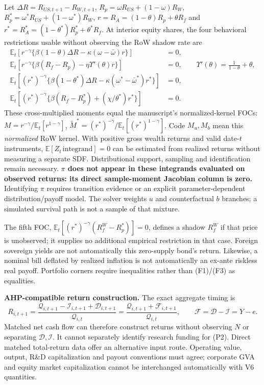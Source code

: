 \documentclass[10pt,a4paper,landscape]{article}
\newcommand{\E}{\mathbb E_t}
\newcommand{\Q}{\mathcal Q}\newcommand{\I}{\mathcal I}\newcommand{\D}{\mathcal D}
\begin{document}
Let $\Delta R=R_{US,t+1}-R_{W,t+1}$, $R_p=\omega R_{US}+(1-\omega)R_W$, $R_p^*=\omega^*R_{US}+(1-\omega^*)R_W$, $r=R_A=(1-\theta)R_p+\theta R_f$ and $r^*=R_A^*=(1-\theta^*)R_p^*+\theta^*R_f$. At interior equity shares, the four behavioral restrictions usable without observing the RoW shadow rate are
\begin{align}
 \E\!\left[r^{-\gamma}\{\beta(1-\theta)\Delta R-\kappa(\omega-\bar\omega)r\}\right]&=0, \tag{F1}\label{eq:F1}\\
 \E\!\left[r^{-\gamma}\{\beta(R_f-R_p)-\eta\Upsilon'(\theta)r\}\right]&=0,\qquad
 \Upsilon'(\theta)=\frac1{1-\theta}+\theta, \tag{F2}\label{eq:F2}\\
 \E\!\left[(r^*)^{-\gamma}\{\beta(1-\theta^*)\Delta R-\kappa(\omega^*-\bar\omega^*)r^*\}\right]&=0, \tag{F3}\label{eq:F3}\\
 \E\!\left[(r^*)^{-\gamma}\{\beta(R_f-R_p^*)+(\chi/\theta^*)r^*\}\right]&=0. \tag{F4}\label{eq:F4}
\end{align}
These cross-multiplied moments equal the manuscript's normalized-kernel FOCs: $M=r^{-\gamma}/\E[r^{1-\gamma}]$, $\widetilde M^*=(r^*)^{-\gamma}/\E[(r^*)^{1-\gamma}]$. Code $M_u,M_b$ mean this \emph{normalized} RoW kernel. With positive gross wealth returns and valid date-$t$ instruments, $\mathbb E[Z_t\,\text{integrand}]=0$ can be estimated from realized returns without measuring a separate SDF. Distributional support, sampling and identification remain necessary. \textbf{$\pi$ does not appear in these integrands evaluated on observed returns: its direct sample-moment Jacobian column is zero.} Identifying $\pi$ requires transition evidence or an explicit parameter-dependent distribution/payoff model. The solver weights $u$ and counterfactual $b$ branches; a simulated survival path is not a sample of that mixture.

The fifth FOC, $\E[(r^*)^{-\gamma}(R_f^W-R_p^*)]=0$, defines a shadow $R_f^W$ if that price is unobserved; it supplies no additional empirical restriction in that case. Foreign sovereign yields are not automatically this zero-supply bond's return. Likewise, a nominal bill deflated by realized inflation is not automatically an ex-ante riskless real payoff. Portfolio corners require inequalities rather than (F1)/(F3) as equalities.

\textbf{AHP-compatible return construction.} The exact aggregate timing is
\[
 R_{i,t+1}=\frac{\Q_{i,t+1}-\I_{i,t+1}+\D_{i,t+1}}{\Q_{i,t}}
 =\frac{\Q_{i,t+1}+\mathcal F_{i,t+1}}{\Q_{i,t}},\qquad \mathcal F=\D-\I=Y-e.
\]
Matched net cash flow can therefore construct returns without observing $N$ or separating $\D,\I$. It cannot separately identify research funding for (P2). Direct matched total-return data offer an alternative input route. Operating value, output, R\&D capitalization and payout conventions must agree; corporate GVA and equity market capitalization cannot be interchanged automatically with V6 quantities.
\end{document}
